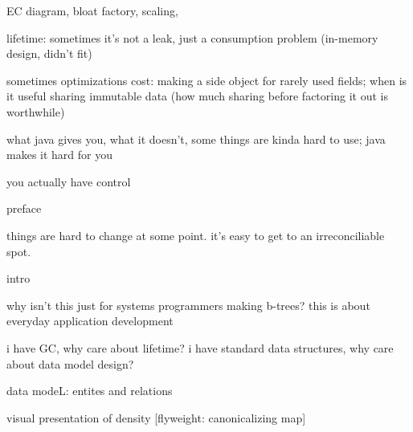 EC diagram, bloat factory, scaling, 

lifetime: sometimes it's not a leak, just a consumption problem (in-memory
design, didn't fit)

sometimes optimizations cost: making a side object for rarely used fields; when
is it useful sharing immutable data (how much sharing before factoring it out
is worthwhile)

what java gives you, what it doesn't, some things are kinda hard to use; java
makes it hard for you

you actually have control



preface

things are hard to change at some point. it's easy to get to an irreconciliable
spot.

intro

why isn't this just for systems programmers making b-trees? this is about
everyday application development

i have GC, why care about lifetime?
i have standard data structures, why care about data model design?

data modeL: entites and relations

visual presentation of density
[flyweight: canonicalizing map]